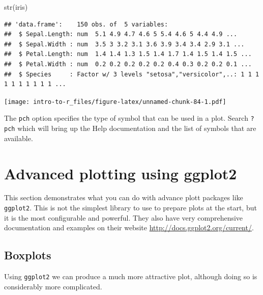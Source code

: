 \documentclass[a4paper]{book}
\newenvironment{Shaded}{}{}
\newcommand{\KeywordTok}[1]{\textcolor[rgb]{0.00,0.00,1.00}{{#1}}}
\newcommand{\DataTypeTok}[1]{{#1}}
\newcommand{\DecValTok}[1]{{#1}}
\newcommand{\NormalTok}[1]{{#1}}
\newlength{\leftbarwidth}
\newlength{\leftbarsep}
\newcommand*{\leftbarcolorcmd}{\color{darkgray}}%
\renewenvironment{leftbar}{%
    \def\FrameCommand{{\leftbarcolorcmd{\vrule width \leftbarwidth\relax\hspace {\leftbarsep}}}}%
    \MakeFramed {\advance \hsize -\width \FrameRestore }%
}{%
    \endMakeFramed
}
\renewenvironment{Shaded}
{\vspace{0em}\begin{leftbar}\begin{snugshade}}
{\end{snugshade}\end{leftbar}\vspace{0pt}}
\begin{document}
\begin{Shaded}
\begin{Highlighting}[]
\KeywordTok{str}\NormalTok{(iris)}
\end{Highlighting}
\end{Shaded}

\begin{verbatim}
## 'data.frame':    150 obs. of  5 variables:
##  $ Sepal.Length: num  5.1 4.9 4.7 4.6 5 5.4 4.6 5 4.4 4.9 ...
##  $ Sepal.Width : num  3.5 3 3.2 3.1 3.6 3.9 3.4 3.4 2.9 3.1 ...
##  $ Petal.Length: num  1.4 1.4 1.3 1.5 1.4 1.7 1.4 1.5 1.4 1.5 ...
##  $ Petal.Width : num  0.2 0.2 0.2 0.2 0.2 0.4 0.3 0.2 0.2 0.1 ...
##  $ Species     : Factor w/ 3 levels "setosa","versicolor",..: 1 1 1 1 1 1 1 1 1 1 ...
\end{verbatim}

\begin{Shaded}
\end{Shaded}

\texttt{[image: intro-to-r\_files/figure-latex/unnamed-chunk-84-1.pdf]}

The \texttt{pch} option specifies the type of symbol that can be used in
a plot. Search \texttt{?pch} which will bring up the Help documentation
and the list of symbols that are available.

\section{Advanced plotting using
ggplot2}\label{advanced-plotting-using-ggplot2}

This section demonstrates what you can do with advance plott packages
like \texttt{ggplot2}. This is not the simplest library to use to
prepare plots at the start, but it is the most configurable and
powerful. They also have very comprehensive documentation and examples
on their website \url{http://docs.ggplot2.org/current/}.

\subsection{Boxplots}\label{boxplots-1}

Using \texttt{ggplot2} we can produce a much more attractive plot,
although doing so is considerably more complicated.
\end{document}
